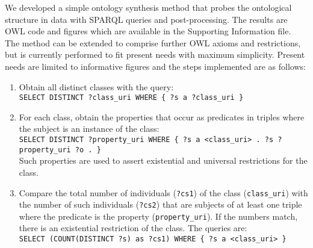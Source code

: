 \documentclass[review]{elsarticle}
\newcommand{\textttt}[1] {\texttt{\footnotesize#1}}
\newcommand{\h} {\hphantom ~ }
\begin{document}
We developed a simple ontology synthesis method that probes
the ontological structure in data with
SPARQL queries and post-processing.
The results are OWL code and figures which are available in the
Supporting Information file.
The method can be extended to comprise further OWL axioms and restrictions,
but is currently performed to fit present needs with maximum simplicity.
Present needs are limited to informative figures and
the steps implemented are as follows:
\begin{enumerate}[leftmargin=0cm]
    \item Obtain all distinct classes with the query:\\
        \textttt{SELECT DISTINCT ?class\_uri WHERE \{ ?s a ?class\_uri \}}
\item For each class, obtain the properties that occur as predicates in triples where the subject is an instance of the class:\\
	\textttt{SELECT DISTINCT ?property\_uri WHERE \{ ?s a <class\_uri> . ?s ?property\_uri ?o . \}}\\
Such properties are used to assert existential and universal restrictions for the class.
\item Compare the total number of individuals (\textttt{?cs1}) of the class (\textttt{class\_uri}) with
	the number of such individuals (\textttt{?cs2}) that are subjects of at least one triple where 
	the predicate is the property (\textttt{property\_uri}).
	If the numbers match, there is an existential restriction of the class. The queries are:\\
	\textttt{SELECT (COUNT(DISTINCT ?s) as ?cs1) WHERE \{ ?s a <class\_uri> \}}\\

\end{enumerate}
\end{document}
